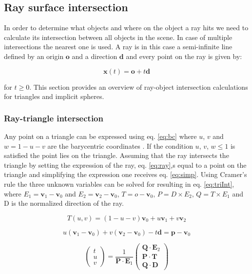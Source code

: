 \documentclass[twocolumn]{article}
\begin{document}
\subsection{Ray surface intersection}
In order to determine what objects and where on the object a ray hits we need to calculate its intersection between all objects in the scene. In case of multiple intersections the nearest one is used. A ray is in this case a semi-infinite line defined by an origin $\mathbf{o}$ and a direction $\mathbf{d}$ and every point on the ray is given by:

\begin{equation}
	\label{eq:ray}
	\mathbf{x}(t) = \mathbf{o} + t\mathbf{d}
\end{equation}

for $t \geq 0$. This section provides an overview of ray-object intersection calculations for triangles and implicit spheres. 

\subsubsection{Ray-triangle intersection}
Any point on a triangle can be expressed using eq. \ref{eq:bc} where $u$, $v$ and $ w = 1 - u - v$ are the barycentric coordinates \cite{hq}. If the condition $u$, $v$, $w \leq 1$ is satisfied the point lies on the triangle. Assuming that the ray intersects the triangle by setting the expression of the ray, eq. \ref{eq:ray},s equal to a point on the triangle and simplifying the expression one receives eq. \ref{eq:simp}. Using Cramer's rule the three unknown variables can be solved for resulting in eq. \ref{eq:triInt}, where $E_1 = \mathbf{v}_1 - \mathbf{v}_0$ and $E_2 = \mathbf{v}_2 - \mathbf{v}_0$, $T = o - \mathbf{v}_0$, $P = D \times E_2$, $Q = T \times E_1$ and D is the normalized direction of the ray.

\begin{equation}
	\label{eq:bc}	
	T(u,v) = (1 - u - v)\mathbf{v}_0 + u\mathbf{v}_1 + v\mathbf{v}_2
\end{equation}

\begin{equation}
	\label{eq:simp}
	u(\mathbf{v}_1 - \mathbf{v}_0) + v(\mathbf{v}_2 - \mathbf{v}_0) - t\mathbf{d} = \mathbf{p} - \mathbf{v}_0
\end{equation}

\begin{equation}
\label{eq:triInt}
\begin{pmatrix}
	t \\
  	u \\
  	v 
\end{pmatrix}
= \frac{1}{\mathbf{P} \cdot \mathbf{E}_1}
\begin{pmatrix}
	  	\mathbf{Q} \cdot \mathbf{E}_2 \\
  		\mathbf{P} \cdot \mathbf{T} \\
  		\mathbf{Q} \cdot \mathbf{D}
\end{pmatrix}
\end{equation}
\end{document}
